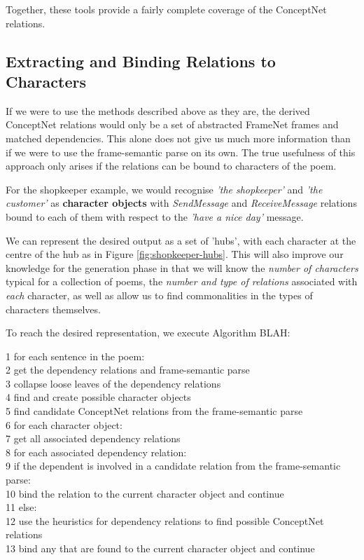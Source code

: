Together, these tools provide a fairly complete coverage of the ConceptNet relations.


\subsection{Extracting and Binding Relations to Characters}

If we were to use the methods described above as they are, the derived ConceptNet relations would only be a set of abstracted FrameNet frames and matched dependencies. This alone does not give us much more information than if we were to use the frame-semantic parse on its own. The true usefulness of this approach only arises if the relations can be bound to characters of the poem. 

For the shopkeeper example, we would recognise \textit{'the shopkeeper'} and \textit{'the customer'} as \textbf{character objects} with \textit{SendMessage} and \textit{ReceiveMessage} relations bound to each of them with respect to the \textit{'have a nice day'} message.

We can represent the desired output as a set of 'hubs', with each character at the centre of the hub as in Figure \ref{fig:shopkeeper-hubs}. This will also improve our knowledge for the generation phase in that we will know the \textit{number of characters} typical for a collection of poems, the \textit{number and type of relations} associated with \textit{each} character, as well as allow us to find commonalities in the types of characters themselves.

To reach the desired representation, we execute Algorithm BLAH:

1 for each sentence in the poem:\\
2   get the dependency relations and frame-semantic parse\\
3	collapse loose leaves of the dependency relations\\
4	find and create possible character objects\\
5	find candidate ConceptNet relations from the frame-semantic parse\\
6	for each character object:\\
7		get all associated dependency relations\\
8		for each associated dependency relation:\\
9			if the dependent is involved in a candidate relation from the frame-semantic parse:\\
10				bind the relation to the current character object and continue\\
11			else:\\
12				use the heuristics for dependency relations to find possible ConceptNet relations\\
13				bind any that are found to the current character object and continue\\
				
